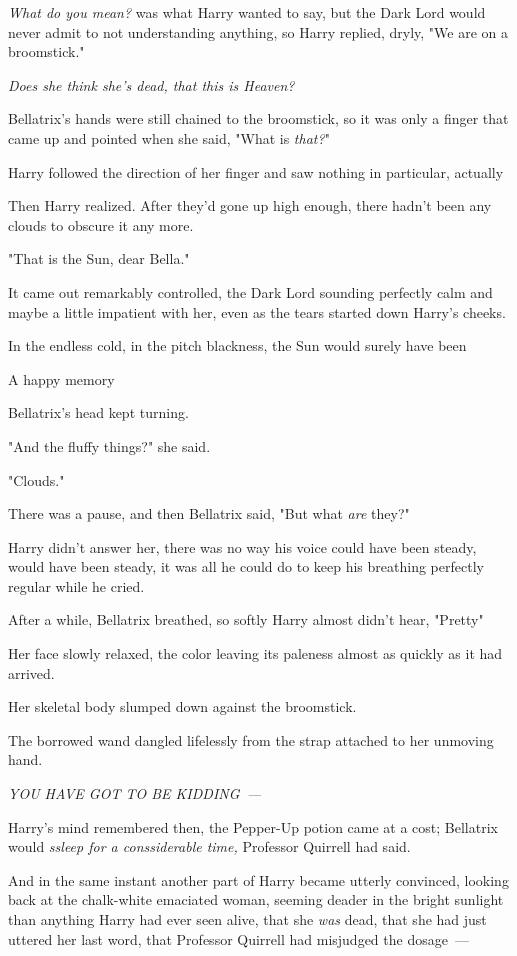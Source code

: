 \emph{What do you mean?} was what Harry wanted to say, but the Dark Lord would
never admit to not understanding anything, so Harry replied, dryly, "We are on
a broomstick."

\emph{Does she think she's dead, that this is Heaven?}

Bellatrix's hands were still chained to the broomstick, so it was only a finger
that came up and pointed when she said, "What is \emph{that?}"

Harry followed the direction of her finger and saw{\el} nothing in
particular, actually{\el}

Then Harry realized. After they'd gone up high enough, there hadn't been any
clouds to obscure it any more.

"That is the Sun, dear Bella."

It came out remarkably controlled, the Dark Lord sounding perfectly calm and
maybe a little impatient with her, even as the tears started down Harry's
cheeks.

In the endless cold, in the pitch blackness, the Sun would surely have
been{\el}

A happy memory{\el}

Bellatrix's head kept turning.

"And the fluffy things?" she said.

"Clouds."

There was a pause, and then Bellatrix said, "But what \emph{are} they?"

Harry didn't answer her, there was no way his voice could have been steady,
would have been steady, it was all he could do to keep his breathing perfectly
regular while he cried.

After a while, Bellatrix breathed, so softly Harry almost didn't hear,
"Pretty{\el}"

Her face slowly relaxed, the color leaving its paleness almost as quickly as it
had arrived.

Her skeletal body slumped down against the broomstick.

The borrowed wand dangled lifelessly from the strap attached to her unmoving
hand.

\emph{YOU HAVE GOT TO BE KIDDING~--- }

Harry's mind remembered then, the Pepper-Up potion came at a cost; Bellatrix
would \emph{ssleep for a conssiderable time,} Professor Quirrell had said.

And in the same instant another part of Harry became utterly convinced, looking
back at the chalk-white emaciated woman, seeming deader in the bright sunlight
than anything Harry had ever seen alive, that she \emph{was} dead, that she had
just uttered her last word, that Professor Quirrell had misjudged the dosage~---


